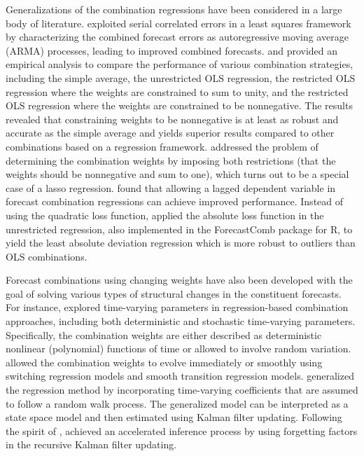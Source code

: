 \documentclass[11pt]{article}
\newcommand{\pkg}[1]{{\normalfont\fontseries{b}\selectfont #1}}
\let\proglang=\textsf
\begin{document}
Generalizations of the combination regressions have been considered in a large body of literature. \citet{Diebold1988-sx} exploited serial correlated errors in a least squares framework by characterizing the combined forecast errors as autoregressive moving average (ARMA) processes, leading to improved combined forecasts. \citet{Gunter1992-go} and \citet{Aksu1992-lb} provided an empirical analysis to compare the performance of various combination strategies, including the simple average, the unrestricted OLS regression, the restricted OLS regression where the weights are constrained to sum to unity, and the restricted OLS regression where the weights are constrained to be nonnegative. The results revealed that constraining weights to be nonnegative is at least as robust and accurate as the simple average and yields superior results compared to other combinations based on a regression framework. \citet{Conflitti2015-fq} addressed the problem of determining the combination weights by imposing both restrictions (that the weights should be nonnegative and sum to one), which turns out to be a special case of a lasso regression. \citet{Edward_Coulson1993-db} found that allowing a lagged dependent variable in forecast combination regressions can achieve improved performance. Instead of using the quadratic loss function, \citet{Nowotarski2014-ev} applied the absolute loss function in the unrestricted regression, also implemented in the \pkg{ForecastComb} package for \proglang{R}, to yield the least absolute deviation regression which is more robust to outliers than OLS combinations.

Forecast combinations using changing weights have also been developed with the goal of solving various types of structural changes in the constituent forecasts. For instance, \citet{Diebold1987-go} explored time-varying parameters in regression-based combination approaches, including both deterministic and stochastic time-varying parameters. Specifically, the combination weights are either described as deterministic nonlinear (polynomial) functions of time or allowed to involve random variation. \citet{Deutsch1994-ob} allowed the combination weights to evolve immediately or smoothly using switching regression models and smooth transition regression models. \citet{Terui2002-df} generalized the regression method by incorporating time-varying coefficients that are assumed to follow a random walk process. The generalized model can be interpreted as a state space model and then estimated using Kalman filter updating. Following the spirit of \citet{Terui2002-df}, \citet{Raftery2010-qe} achieved an accelerated inference process by using forgetting factors in the recursive Kalman filter updating.
\end{document}
